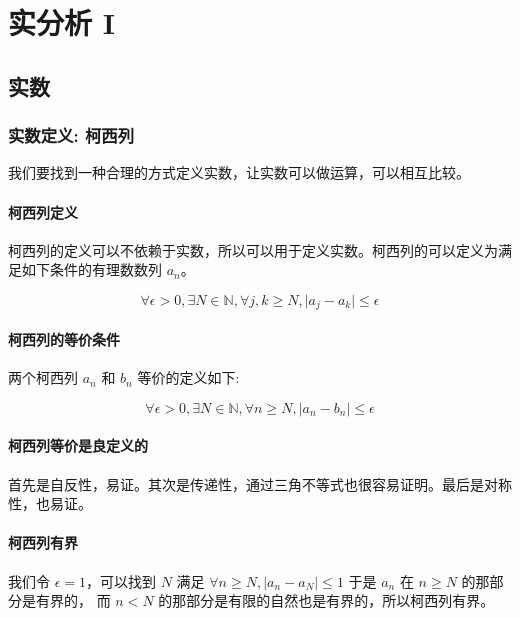 \chapter{实分析 I}

\section{实数}

\subsection{实数定义: 柯西列}

我们要找到一种合理的方式定义实数，让实数可以做运算，可以相互比较。

\subsubsection{柯西列定义}

柯西列的定义可以不依赖于实数，所以可以用于定义实数。柯西列的可以定义为满足如下条件的有理数数列 $ a_n $。

\[ \forall \epsilon > 0, \exists N \in \mathbb{N}, 
    \forall j, k \ge N, \lvert a_j - a_k \rvert \le \epsilon \] 

\subsubsection{柯西列的等价条件}

两个柯西列 $a_n$ 和 $b_n$ 等价的定义如下:

\[ 
    \forall \epsilon > 0, \exists N \in \mathbb{N},
    \forall n \ge N, \lvert a_n - b_n \rvert \le \epsilon 
\]

\subsubsection{柯西列等价是良定义的}

首先是自反性，易证。其次是传递性，通过三角不等式也很容易证明。最后是对称性，也易证。

\subsubsection{柯西列有界}

我们令 $\epsilon = 1 $，可以找到 $N$ 满足 $\forall n \ge N , \lvert a_n - a_N \rvert \le 1 $ 于是 $a_n$ 在 $n \ge N$ 的那部分是有界的，
而 $n < N$ 的那部分是有限的自然也是有界的，所以柯西列有界。

